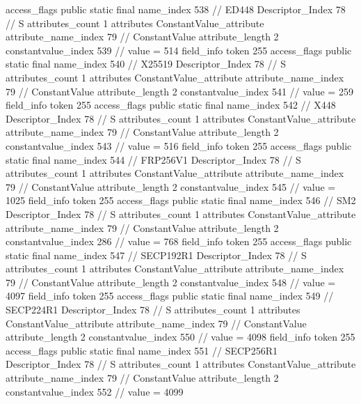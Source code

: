 {{{{{				access_flags	public static final
				name_index	538		// ED448
				Descriptor_Index	78		// S
				attributes_count	1
				attributes {
				ConstantValue_attribute {
					attribute_name_index	79		// ConstantValue
					attribute_length	2
					constantvalue_index	539		// value = 514
				}
				}
			}
			field_info {
				token	255
				access_flags	public static final
				name_index	540		// X25519
				Descriptor_Index	78		// S
				attributes_count	1
				attributes {
				ConstantValue_attribute {
					attribute_name_index	79		// ConstantValue
					attribute_length	2
					constantvalue_index	541		// value = 259
				}
				}
			}
			field_info {
				token	255
				access_flags	public static final
				name_index	542		// X448
				Descriptor_Index	78		// S
				attributes_count	1
				attributes {
				ConstantValue_attribute {
					attribute_name_index	79		// ConstantValue
					attribute_length	2
					constantvalue_index	543		// value = 516
				}
				}
			}
			field_info {
				token	255
				access_flags	public static final
				name_index	544		// FRP256V1
				Descriptor_Index	78		// S
				attributes_count	1
				attributes {
				ConstantValue_attribute {
					attribute_name_index	79		// ConstantValue
					attribute_length	2
					constantvalue_index	545		// value = 1025
				}
				}
			}
			field_info {
				token	255
				access_flags	public static final
				name_index	546		// SM2
				Descriptor_Index	78		// S
				attributes_count	1
				attributes {
				ConstantValue_attribute {
					attribute_name_index	79		// ConstantValue
					attribute_length	2
					constantvalue_index	286		// value = 768
				}
				}
			}
			field_info {
				token	255
				access_flags	public static final
				name_index	547		// SECP192R1
				Descriptor_Index	78		// S
				attributes_count	1
				attributes {
				ConstantValue_attribute {
					attribute_name_index	79		// ConstantValue
					attribute_length	2
					constantvalue_index	548		// value = 4097
				}
				}
			}
			field_info {
				token	255
				access_flags	public static final
				name_index	549		// SECP224R1
				Descriptor_Index	78		// S
				attributes_count	1
				attributes {
				ConstantValue_attribute {
					attribute_name_index	79		// ConstantValue
					attribute_length	2
					constantvalue_index	550		// value = 4098
				}
				}
			}
			field_info {
				token	255
				access_flags	public static final
				name_index	551		// SECP256R1
				Descriptor_Index	78		// S
				attributes_count	1
				attributes {
				ConstantValue_attribute {
					attribute_name_index	79		// ConstantValue
					attribute_length	2
					constantvalue_index	552		// value = 4099
}}}}}}}
